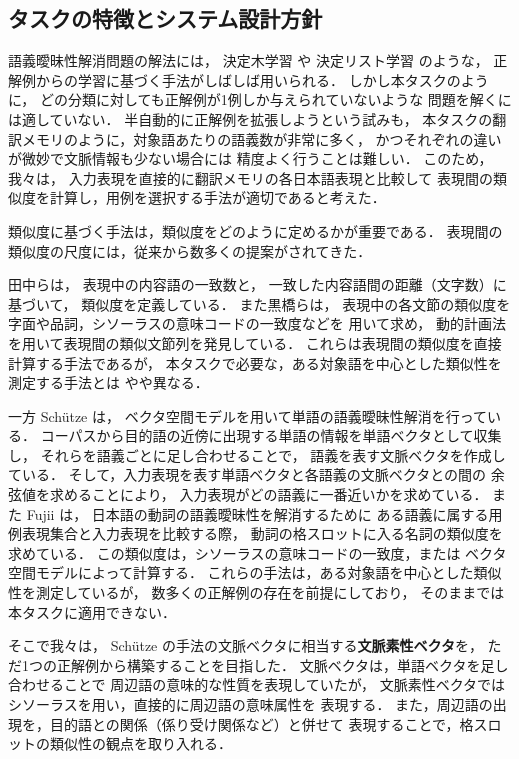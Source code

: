 \subsection{タスクの特徴とシステム設計方針}
語義曖昧性解消問題の解法には，
決定木学習\cite{tanaka:94} や
決定リスト学習\cite{yarowsky:95} のような，
正解例からの学習に基づく手法がしばしば用いられる．
しかし本タスクのように，
どの分類に対しても正解例が1例しか与えられていないような
問題を解くには適していない．
半自動的に正解例を拡張しようという試みも，
本タスクの翻訳メモリのように，対象語あたりの語義数が非常に多く，
かつそれぞれの違いが微妙で文脈情報も少ない場合には
精度よく行うことは難しい．
このため，我々は，
入力表現を直接的に翻訳メモリの各日本語表現と比較して
表現間の類似度を計算し，用例を選択する手法が適切であると考えた．

類似度に基づく手法は，類似度をどのように定めるかが重要である．
表現間の類似度の尺度には，従来から数多くの提案がされてきた．

田中らは，
表現中の内容語の一致数と，
一致した内容語間の距離（文字数）に基づいて，
類似度を定義している\cite{tanaka:99}．
また黒橋らは，
表現中の各文節の類似度を字面や品詞，シソーラスの意味コードの一致度などを
用いて求め，
動的計画法を用いて表現間の類似文節列を発見している\cite{kurohashi:92}．
これらは表現間の類似度を直接計算する手法であるが，
本タスクで必要な，ある対象語を中心とした類似性を測定する手法とは
やや異なる．

一方 Sch\"utze は，
ベクタ空間モデルを用いて単語の語義曖昧性解消を行っている．
コーパスから目的語の近傍に出現する単語の情報を単語ベクタとして収集し，
それらを語義ごとに足し合わせることで，
語義を表す文脈ベクタを作成している．
そして，入力表現を表す単語ベクタと各語義の文脈ベクタとの間の
余弦値を求めることにより，
入力表現がどの語義に一番近いかを求めている\cite{schutze:97}．
また Fujii は，
日本語の動詞の語義曖昧性を解消するために
ある語義に属する用例表現集合と入力表現を比較する際，
動詞の格スロットに入る名詞の類似度を求めている．
この類似度は，シソーラスの意味コードの一致度，または
ベクタ空間モデルによって計算する\cite{fujii:98}．
これらの手法は，ある対象語を中心とした類似性を測定しているが，
数多くの正解例の存在を前提にしており，
そのままでは本タスクに適用できない．

そこで我々は，
Sch\"utze の手法の文脈ベクタに相当する{\bf 文脈素性ベクタ}を，
ただ1つの正解例から構築することを目指した．
文脈ベクタは，単語ベクタを足し合わせることで
周辺語の意味的な性質を表現していたが，
文脈素性ベクタではシソーラスを用い，直接的に周辺語の意味属性を
表現する．
また，周辺語の出現を，目的語との関係（係り受け関係など）と併せて
表現することで，格スロットの類似性の観点を取り入れる．




